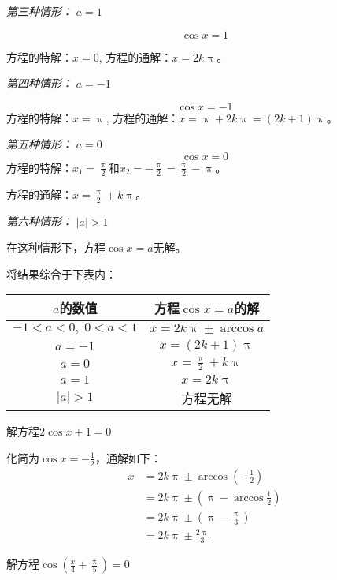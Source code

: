 \emph{第三种情形：} $a=1$

\[\cos x=1\]

方程的特解：$x=0$, 方程的通解：$x=2k\uppi$。

\emph{第四种情形：} $a=-1$

\[\cos x=-1\]
方程的特解：$x=\uppi$, 方程的通解：$x=\uppi+2k\uppi=(2k+1)\uppi$。

\emph{第五种情形：} $a=0$
\[\cos x=0\]
方程的特解：$x_1=\frac{\uppi}{2}$和$x_2=-\frac{\uppi}{2}=\frac{\uppi}{2}-\uppi$。

方程的通解：$x=\frac{\uppi}{2}+k\uppi$。

\emph{第六种情形：} $|a|>1$

在这种情形下，方程$\cos x=a$无解。

将结果综合于下表内：
\begin{center}
    \begin{tabular}{c|c}
        \hline
    $a$的数值& 方程$\cos x=a$的解\\
        \hline
    $-1<a<0,\; 0<a<1$ & $x=2k\uppi \pm \arccos a$\\
    $a=-1$& $x=(2k+1)\uppi$\\
    $a=0$&   $x=\frac{\uppi}{2}+k\uppi$\\
    $a=1$& $x=2k\uppi$\\
    $|a|>1$ & 方程无解\\
        \hline
    \end{tabular}   
    \end{center}



\begin{example}
    解方程$2\cos x+1=0$
\end{example}

\begin{solution}
    化简为$\cos x=-\frac{1}{2}$，通解如下：
\[\begin{split}
    x&=2k\uppi\pm\arccos\left(-\frac{1}{2}\right)\\
    &=2k\uppi\pm \left(\uppi-\arccos\frac{1}{2}\right)\\
    &=2k\uppi\pm \left(\uppi-\frac{\uppi}{3}\right)\\
    &=2k\uppi\pm \frac{2\uppi}{3}
\end{split}\]
\end{solution}


\begin{example}
    解方程$\cos\left(\frac{x}{4}+\frac{\uppi}{5}\right)=0$
\end{example}

